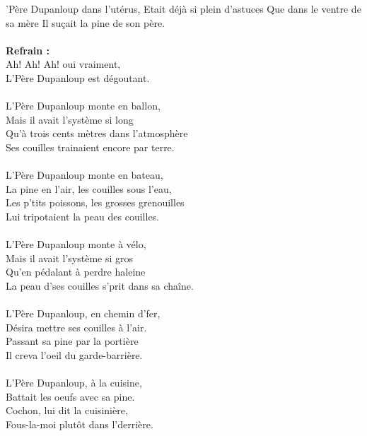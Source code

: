 
 'Père Dupanloup dans l'utérus, \bissimple
Etait déjà si plein d'astuces \bissimple
Que dans le ventre de sa mère
Il suçait la pine de son père.
\\\\\textbf{Refrain :}
\\Ah! Ah! Ah! oui vraiment,
\\L'Père Dupanloup est dégoutant.
\\\\L'Père Dupanloup monte en ballon, \bissimple
\\Mais il avait l'système si long \bissimple
\\Qu'à trois cents mètres dans l'atmosphère
\\Ses couilles trainaient encore par terre.
\\\\L'Père Dupanloup monte en bateau, \bissimple
\\La pine en l'air, les couilles sous l'eau, \bissimple
\\Les p'tits poissons, les grosses grenouilles
\\Lui tripotaient la peau des couilles.
\\\\L'Père Dupanloup monte à vélo, \bissimple
\\Mais il avait l'système si gros \bissimple
\\Qu'en pédalant à perdre haleine
\\La peau d'ses couilles s'prit dans sa chaîne.
\\\\L'Père Dupanloup, en chemin d'fer, \bissimple
\\Désira mettre ses couilles à l'air. \bissimple
\\Passant sa pine par la portière
\\Il creva l'oeil du garde-barrière.
\\\\L'Père Dupanloup, à la cuisine, \bissimple
\\Battait les oeufs avec sa pine. \bissimple
\\Cochon, lui dit la cuisinière,
\\Fous-la-moi plutôt dans l'derrière.
